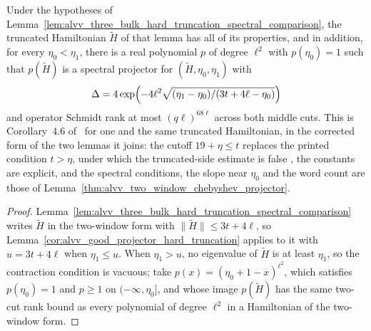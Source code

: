 \begin{lemma}
    \label{cor:alvv_good_projector_hard_truncation_combined}
    \leanok
    Under the hypotheses of
    Lemma~\ref{lem:alvv_three_bulk_hard_truncation_spectral_comparison}, the
    truncated Hamiltonian $\tilde H$ of that lemma has all of its properties,
    and in addition, for every $\eta_0<\eta_1$, there is a real
    polynomial $p$ of degree $\ell^2$ with $p(\eta_0)=1$ such that
    $p(\tilde H)$ is a spectral projector for $(\tilde H,\eta_0,\eta_1)$ with
    \[
        \Delta=4\exp\Bigl(-4\ell^2\sqrt{(\eta_1-\eta_0)/(3t+4\ell-\eta_0)}\Bigr)
    \]
    and operator Schmidt rank at most $(q\ell)^{68\ell}$ across both middle
    cuts. This is Corollary~4.6 of~\cite{Arad2016RigorousRG} for one and the
    same truncated Hamiltonian, in the corrected form of the two lemmas it
    joins: the cutoff $19+\eta\le t$ replaces the printed condition $t>\eta$,
    under which the truncated-side estimate is false
    \cite{gap:alvv16_hard_truncation_windows}, the constants are explicit,
    and the spectral conditions, the slope near $\eta_0$ and the word count
    are those of Lemma~\ref{thm:alvv_two_window_chebyshev_projector}.
\end{lemma}
\begin{proof}\leanok
    Lemma~\ref{lem:alvv_three_bulk_hard_truncation_spectral_comparison} writes
    $\tilde H$ in the two-window form with $\|\tilde H\|\le3t+4\ell$, so
    Lemma~\ref{cor:alvv_good_projector_hard_truncation} applies to it with
    $u=3t+4\ell$ when $\eta_1\le u$. When $\eta_1>u$, no eigenvalue of
    $\tilde H$ is at least $\eta_1$, so the contraction condition is vacuous;
    take $p(x)=(\eta_0+1-x)^{\ell^2}$, which satisfies $p(\eta_0)=1$ and
    $p\ge1$ on $(-\infty,\eta_0]$, and whose image $p(\tilde H)$ has the same
    two-cut rank bound as every polynomial of degree $\ell^2$ in a Hamiltonian
    of the two-window form.
\end{proof}

